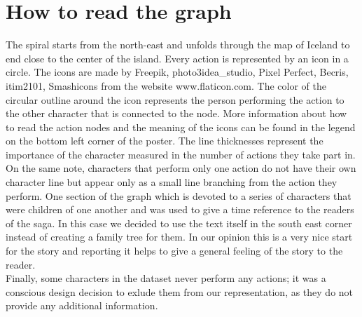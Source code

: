 \documentclass[runningheads]{llncs}
\begin{document}
\section{How to read the graph}

The spiral starts from the north-east and unfolds through the map of Iceland to end close to the center of the island. Every action is represented by an icon in a circle. The icons are made by Freepik, photo3idea\_studio, Pixel Perfect, Becris, itim2101, Smashicons from the website www.flaticon.com. The color of the circular outline around the icon represents the person performing the action to the other character that is connected to the node. More information about how to read the action nodes and the meaning of the icons can be found in the legend on the bottom left corner of the poster. The line thicknesses represent the importance of the character measured in the number of actions they take part in. On the same note, characters that perform only one action do not have their own character line but appear only as a small line branching from the action they perform. One section of the graph which is devoted to a series of characters that were children of one another and was used to give a time reference to the readers of the saga. In this case we decided to use the text itself in the south east corner instead of creating a family tree for them. In our opinion this is a very nice start for the story and reporting it helps to give a general feeling of the story to the reader. \\
Finally, some characters in the dataset never perform any actions; it was a conscious design decision to exlude them from our representation, as they do not provide any additional information.






%
%
%
% 
% 
%
%
\end{document}
